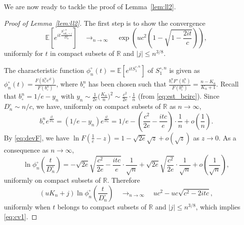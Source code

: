 \documentclass[10pt]{amsart}
\theoremstyle{definition}\newtheorem{defi}[theo]{Definition}\newtheorem{rema}[theo]{Remark}\newtheorem{exam}[theo]{Example}\newtheorem{exem}[theo]{Example}\newtheorem{nota}[theo]{Notation}
\newcommand{\R}{\mathbb{R}}
\def\bcn{b_{\circ}^{n}}
\def\Scn{S^{\circ,n}}
\def\phicn{\phi^{\circ}_{n}}
\def\Dcn{D^{\circ}_{n}}
\newcommand\Es[1]{\mathbb{E}\left[#1\right]}
\begin{document}
We are now ready to tackle the proof of Lemma~\ref{lem:ll2}.
\begin{proof}[Proof of Lemma~\ref{lem:ll2}]
The first step is to show the convergence
\begin{equation}
\label{eq:cv1}\Es{e^{i t \frac{\Scn_{ u K_{n} +j}}{ \Dcn }}}  \quad \mathop{\longrightarrow}_{n \rightarrow \infty} \quad \exp \left( u c^{2} \left( 1 -\sqrt{1-  \frac{2it}{c}}  \right)  \right),
\end{equation}
uniformly for $t$ in compact subsets of $\R$ and $|j| \leq n^{3/8}$.

The characteristic function $\phicn(t)=\Es{e^{it\Scn_{1}}}$  of $\Scn_{1}$
is given as $\phicn(t)= \frac{F( \bcn e^{it})}{F(\bcn)}$,
where $\bcn$ has been chosen such that $ \frac{\bcn F'(\bcn)}{F(\bcn)}= \frac{n-K_{n}}{K_{n}+1}$.
Recall that $\bcn=1/e-y_{n}$ with
\hbox{$y_{n} \sim \frac{1}{2e}  \big( \frac{K_{n}}{n} \big)^{2} \sim \frac{c^{2}}{2e} \cdot \frac{1}{n}$}
(from \eqref{eq:est_bcirc}).
Since $ \Dcn \sim  n /c$, we have, uniformly on compact subsets of $\R$ as $n \rightarrow \infty$,
\[\bcn e^{ \frac{it}{\Dcn}}=(1/e-y_{n})e^{ \frac{it}{\Dcn}}=1/e-  \left( \frac{c^{2}}{2e} - \frac{it c}{e } \right) \cdot \frac{1}{{n}}+o \left(  \frac{1}{n} \right).\]
By \eqref{eq:devF}, we have $ \ln F \left( \frac{1}{e}-z \right)= 1-\sqrt{2e} \sqrt{z}+o(\sqrt{z})$ as $z \rightarrow 0$.
As a consequence as $n \rightarrow \infty$, \[\ln \phicn \left( \frac{t}{ \Dcn } \right)=-\sqrt{2e} \sqrt{ \frac{c^{2}}{2e} - \frac{it c}{e}} \cdot \frac{1}{\sqrt{n}} + \sqrt{2e} \sqrt{ \frac{c^{2}}{2e}} \cdot \frac{1}{\sqrt{n}}+o \left(  \frac{1}{\sqrt{n}} \right),\]
 uniformly on compact subsets of $\R$. Therefore
\[( uK_{n}  +j) \ln \phicn \left( \frac{t}{\Dcn} \right)  \quad \mathop{\longrightarrow}_{n \rightarrow \infty} \quad u c^{2}-uc \sqrt{c^{2}- 2itc},\]
 uniformly when $t$ belongs to compact subsets of $\R$ and $|j| \leq n^{3/8}$, which implies \eqref{eq:cv1}.


\end{proof}
\end{document}
